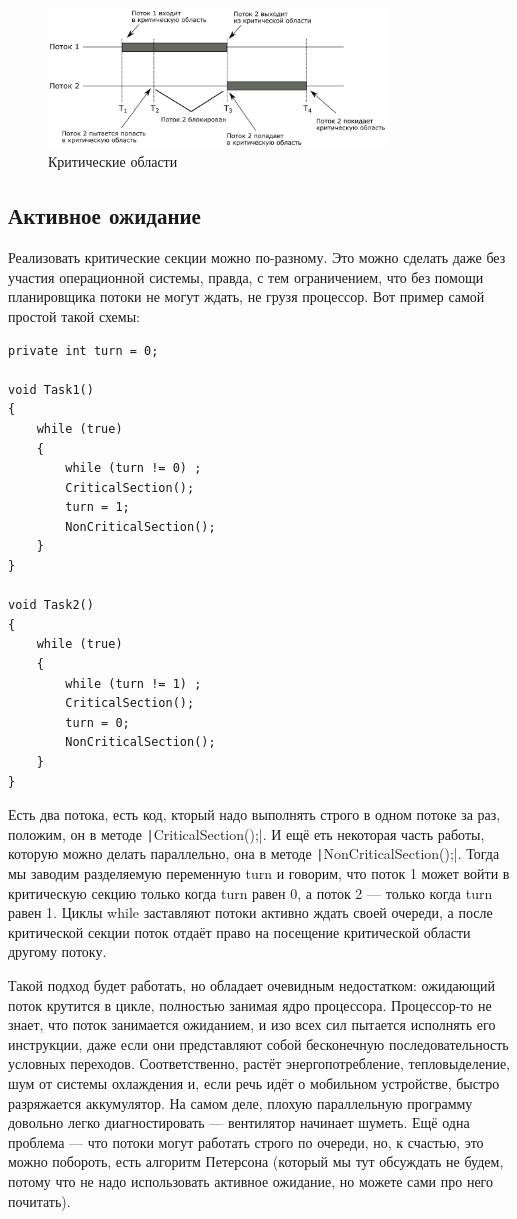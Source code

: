 \documentclass[a5paper]{article}
\begin{document}
\begin{figure}[ht]
    \centering
        \includegraphics[width=0.8\textwidth]{criticalSections.png}
    \caption{Критические области}
    \label{image:criticalSections}
\end{figure}

\subsection{Активное ожидание}

Реализовать критические секции можно по-разному. Это можно сделать даже без участия операционной системы, правда, с тем ограничением, что без помощи планировщика потоки не могут ждать, не грузя процессор. Вот пример самой простой такой схемы:

\begin{verbatim}
private int turn = 0;

void Task1()
{
    while (true)
    {
        while (turn != 0) ;
        CriticalSection();
        turn = 1;
        NonCriticalSection();
    }
}

void Task2()
{
    while (true)
    {
        while (turn != 1) ;
        CriticalSection();
        turn = 0;
        NonCriticalSection();
    }
}
\end{verbatim}

Есть два потока, есть код, кторый надо выполнять строго в одном потоке за раз, положим, он в методе \texttt|CriticalSection();|. И ещё еть некоторая часть работы, которую можно делать параллельно, она в методе \texttt|NonCriticalSection();|. Тогда мы заводим разделяемую переменную turn и говорим, что поток 1 может войти в критическую секцию только когда turn равен 0, а поток 2 --- только когда turn равен 1. Циклы while заставляют потоки активно ждать своей очереди, а после критической секции поток отдаёт право на посещение критической области другому потоку.

Такой подход будет работать, но обладает очевидным недостатком: ожидающий поток крутится в цикле, полностью занимая ядро процессора. Процессор-то не знает, что поток занимается ожиданием, и изо всех сил пытается исполнять его инструкции, даже если они представляют собой бесконечную последовательность условных переходов. Соответственно, растёт энергопотребление, тепловыделение, шум от системы охлаждения и, если речь идёт о мобильном устройстве, быстро разряжается аккумулятор. На самом деле, плохую параллельную программу довольно легко диагностировать --- вентилятор начинает шуметь. Ещё одна проблема --- что потоки могут работать строго по очереди, но, к счастью, это можно побороть, есть алгоритм Петерсона (который мы тут обсуждать не будем, потому что не надо использовать активное ожидание, но можете сами про него почитать).
\end{document}

